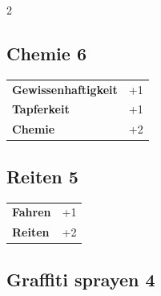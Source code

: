 \begin{multicols}{2}
\begin{tcolorbox}
\end{tcolorbox}

\begin{tcolorbox}
    \subsection*{Chemie \hfill \small{6 }}
    \tcblower




\begin{tabular}{@{}ll@{}}
    \textbf{Gewissenhaftigkeit} & +1\\
    \textbf{Tapferkeit} & +1\\
    \textbf{Chemie} & +2\\
\end{tabular}


\end{tcolorbox}

\begin{tcolorbox}
    \subsection*{Reiten \hfill \small{5 }}
    \tcblower




\begin{tabular}{@{}ll@{}}
    \textbf{Fahren} & +1\\
    \textbf{Reiten} & +2\\
\end{tabular}


\end{tcolorbox}

\begin{tcolorbox}
    \subsection*{Graffiti sprayen \hfill \small{4 }}
    \tcblower





\end{tcolorbox}
\end{multicols}
